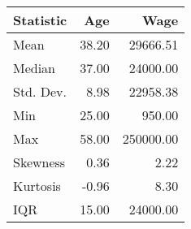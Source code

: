 \begin{table}[ht]
\centering
\begin{tabular}{lrr}
  \hline
Statistic & Age & Wage \\ 
  \hline
Mean & 38.20 & 29666.51 \\ 
  Median & 37.00 & 24000.00 \\ 
  Std. Dev. & 8.98 & 22958.38 \\ 
  Min & 25.00 & 950.00 \\ 
  Max & 58.00 & 250000.00 \\ 
  Skewness & 0.36 & 2.22 \\ 
  Kurtosis & -0.96 & 8.30 \\ 
  IQR & 15.00 & 24000.00 \\ 
   \hline
\end{tabular}
\end{table}
